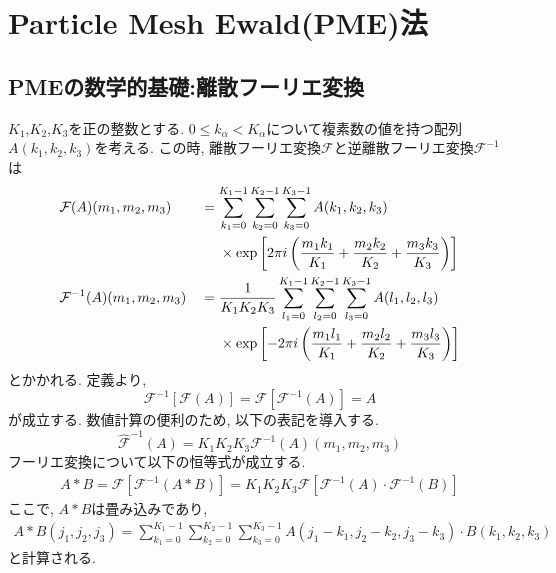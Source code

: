 \clearpage
\section{Particle Mesh Ewald(PME)法}
\subsection{PMEの数学的基礎:離散フーリエ変換}
$K_{1}$,$K_{2}$,$K_{3}$を正の整数とする.
$0 \le k_{\alpha} < K_{\alpha}$について複素数の値を持つ配列$A(k_{1}, k_{2}, k_{3})$を考える.
この時, 離散フーリエ変換$\mathcal{F}$と逆離散フーリエ変換$\mathcal{F}^{-1}$は
\begin{alignat}{2}
 &   \mathcal{F}(A)(m_{1},m_{2},m_{3})
 &&=
     \sum_{k_{1}=0}^{K_{1}-1} \sum_{k_{2}=0}^{K_{2}-1} \sum_{k_{3}=0}^{K_{3}-1}
     A(k_{1}, k_{2}, k_{3})
 \notag
 \\
 & &&
 ~~~~ \times
 \exp
 \left[ 2\pi i
        \left(
               \frac{m_{1} k_{1}}{K_{1}} + \frac{m_{2} k_{2}}{K_{2}} + \frac{m_{3} k_{3}}{K_{3}}
        \right)
 \right]
 \label{eq:PME1}
 \\
 &   \mathcal{F}^{-1} (A)(m_{1},m_{2},m_{3})
 &&=
     \frac{1}{K_{1} K_{2} K_{3}}
     \sum_{l_{1}=0}^{K_{1}-1} \sum_{l_{2}=0}^{K_{2}-1} \sum_{l_{3}=0}^{K_{3}-1}
     A(l_{1}, l_{2}, l_{3})
 \notag
 \\
 & &&
 ~~~~ \times
 \exp
 \left[ -2\pi i
        \left(
               \frac{m_{1} l_{1}}{K_{1}} + \frac{m_{2} l_{2}}{K_{2}} + \frac{m_{3} l_{3}}{K_{3}}
        \right)
 \right]
 \label{eq:PME2}
\end{alignat}
とかかれる. 定義より,
\begin{equation}
    \mathcal{F}^{-1} \left[ \mathcal{F} (A) \right]
  =
    \mathcal{F} \left[ \mathcal{F}^{-1} (A) \right]
  =
   A
 \label{eq:PME3}
\end{equation}
が成立する.
数値計算の便利のため, 以下の表記を導入する.
\begin{equation}
    \hat{\mathcal{F}}^{-1}(A)
  =
    K_{1} K_{2} K_{3} \mathcal{F}^{-1} (A)(m_{1},m_{2},m_{3})
 \label{eq:PME4}
\end{equation}
フーリエ変換について以下の恒等式が成立する.
\begin{align}
   A * B
 = \mathcal{F} \left[ \mathcal{F}^{-1} (A*B) \right]
 = K_{1} K_{2} K_{3} \mathcal{F} \left[ \mathcal{F}^{-1} (A) \cdot \mathcal{F}^{-1} (B) \right]
 \label{eq:PME5}
\end{align}
ここで, $A*B$は畳み込みであり,
\begin{align}
   A*B(j_{1}, j_{2}, j_{3})
 =
   \sum_{k_{1}=0}^{K_{1}-1} \sum_{k_{2}=0}^{K_{2}-1} \sum_{k_{3}=0}^{K_{3}-1}
   A(j_{1}-k_{1}, j_{2}-k_{2}, j_{3} - k_{3})
   \cdot
   B(k_{1}, k_{2}, k_{3})
 \label{eq:PME6}
\end{align}
と計算される.

